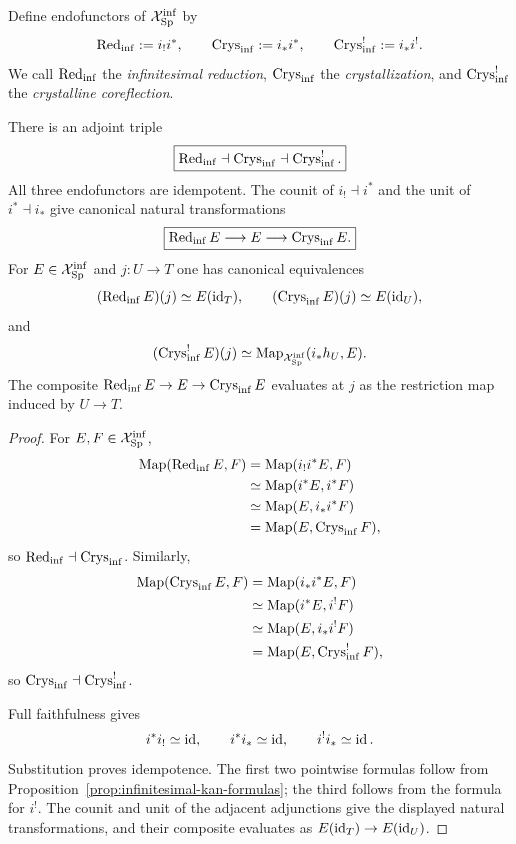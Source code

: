 \begin{definition}
\label{def:infinitesimal-modalities}
Define endofunctors of $\mathcal X_{\mathrm{Sp}}^{\mathrm{inf}}$ by
\[
    \operatorname{Red}_{\mathrm{inf}}:=i_!i^*,
    \qquad
    \operatorname{Crys}_{\mathrm{inf}}:=i_*i^*,
    \qquad
    \operatorname{Crys}^{!}_{\mathrm{inf}}:=i_*i^!.
\]
We call $\operatorname{Red}_{\mathrm{inf}}$ the \emph{infinitesimal reduction}, $\operatorname{Crys}_{\mathrm{inf}}$ the
\emph{crystallization}, and $\operatorname{Crys}^{!}_{\mathrm{inf}}$ the \emph{crystalline
coreflection}.
\end{definition}

\begin{theorem}
\label{thm:infinitesimal-modal-triple}
There is an adjoint triple
\[
    \boxed{
    \operatorname{Red}_{\mathrm{inf}}\dashv\operatorname{Crys}_{\mathrm{inf}}\dashv\operatorname{Crys}^{!}_{\mathrm{inf}}.
    }
\]
All three endofunctors are idempotent.  The counit of $i_!\dashv i^*$ and the
unit of $i^*\dashv i_*$ give canonical natural transformations
\[
    \boxed{
    \operatorname{Red}_{\mathrm{inf}} E\longrightarrow E\longrightarrow\operatorname{Crys}_{\mathrm{inf}} E.
    }
\]
For $E\in\mathcal X_{\mathrm{Sp}}^{\mathrm{inf}}$ and $j:U\to T$ one has canonical
equivalences
\[
    (\operatorname{Red}_{\mathrm{inf}} E)(j)\simeq E(\operatorname{id}_T),
    \qquad
    (\operatorname{Crys}_{\mathrm{inf}} E)(j)\simeq E(\operatorname{id}_U),
\]
and
\[
    (\operatorname{Crys}^{!}_{\mathrm{inf}} E)(j)
    \simeq
    \operatorname{Map}_{\mathcal X_{\mathrm{Sp}}^{\mathrm{inf}}}(i_*h_U,E).
\]
The composite $\operatorname{Red}_{\mathrm{inf}} E\to E\to\operatorname{Crys}_{\mathrm{inf}} E$ evaluates at $j$ as the
restriction map induced by $U\to T$.
\end{theorem}

\begin{proof}
For $E,F\in\mathcal X_{\mathrm{Sp}}^{\mathrm{inf}}$,
\[
\begin{aligned}
    \operatorname{Map}(\operatorname{Red}_{\mathrm{inf}} E,F)
    &=\operatorname{Map}(i_!i^*E,F)\\
    &\simeq\operatorname{Map}(i^*E,i^*F)\\
    &\simeq\operatorname{Map}(E,i_*i^*F)\\
    &=\operatorname{Map}(E,\operatorname{Crys}_{\mathrm{inf}} F),
\end{aligned}
\]
so $\operatorname{Red}_{\mathrm{inf}}\dashv\operatorname{Crys}_{\mathrm{inf}}$.  Similarly,
\[
\begin{aligned}
    \operatorname{Map}(\operatorname{Crys}_{\mathrm{inf}} E,F)
    &=\operatorname{Map}(i_*i^*E,F)\\
    &\simeq\operatorname{Map}(i^*E,i^!F)\\
    &\simeq\operatorname{Map}(E,i_*i^!F)\\
    &=\operatorname{Map}(E,\operatorname{Crys}^{!}_{\mathrm{inf}} F),
\end{aligned}
\]
so $\operatorname{Crys}_{\mathrm{inf}}\dashv\operatorname{Crys}^{!}_{\mathrm{inf}}$.

Full faithfulness gives
\[
    i^*i_!\simeq\operatorname{id},
    \qquad
    i^*i_*\simeq\operatorname{id},
    \qquad
    i^!i_*\simeq\operatorname{id}.
\]
Substitution proves idempotence.  The first two pointwise formulas follow from
Proposition~\ref{prop:infinitesimal-kan-formulas}; the third follows from the
formula for $i^!$.  The counit and unit of the adjacent adjunctions give the
displayed natural transformations, and their composite evaluates as
$E(\operatorname{id}_T)\to E(\operatorname{id}_U)$.
\end{proof}

